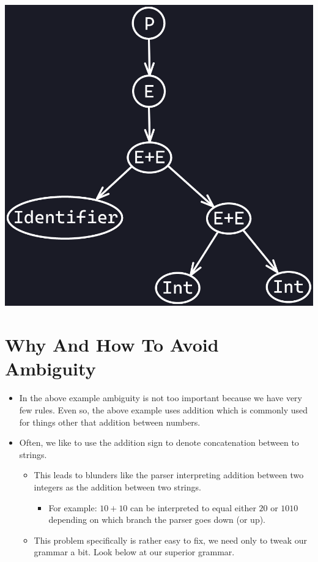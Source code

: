 \documentclass{article}
\begin{document}
\begin{center}
    \includegraphics[scale=0.35]{image2.png}
\end{center}

\section{Why And How To Avoid Ambiguity}
\begin{itemize}
    \item In the above example ambiguity is not too important because we have very few rules. Even so, the above example uses addition which is commonly used for things other that addition between numbers. 
    \item Often, we like to use the addition sign to denote concatenation between to strings.
    \begin{itemize}
        \item This leads to blunders like the parser interpreting addition between two integers as the addition between two strings.
        \begin{itemize}
            \item For example: $10+10$ can be interpreted to equal either $20$ or $1010$ depending on which branch the parser goes down (or up).
        \end{itemize}
        \item This problem specifically is rather easy to fix, we need only to tweak our grammar a bit. Look below at our superior grammar.
    \end{itemize}
\end{itemize}
\end{document}
